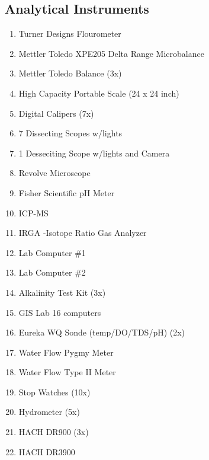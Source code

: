 \documentclass[12pt]{../SOP4_alpha}\usepackage[]{graphicx}\usepackage[]{color}
\begin{document}
\subsection{Analytical Instruments}
\begin{enumerate}
  \item Turner Designs Flourometer
  \item Mettler Toledo XPE205 Delta Range Microbalance
  \item Mettler Toledo Balance (3x)
  \item High Capacity Portable Scale (24 x 24 inch)
  \item Digital Calipers (7x)
  \item 7 Dissecting Scopes w/lights
  \item 1 Desseciting Scope w/lights and Camera
  \item Revolve Microscope
  \item Fisher Scientific pH Meter
  \item ICP-MS
  \item IRGA  -Isotope Ratio Gas Analyzer
  \item Lab Computer \#1
  \item Lab Computer \#2
  \item Alkalinity Test Kit (3x)
  \item GIS Lab 16 computers
  \item Eureka WQ Sonde (temp/DO/TDS/pH) (2x)
  \item Water Flow Pygmy Meter
  \item Water Flow Type II Meter
  \item Stop Watches (10x)
  \item Hydrometer (5x)
  \item HACH DR900 (3x)
  \item HACH DR3900
\end{enumerate}
\end{document}
